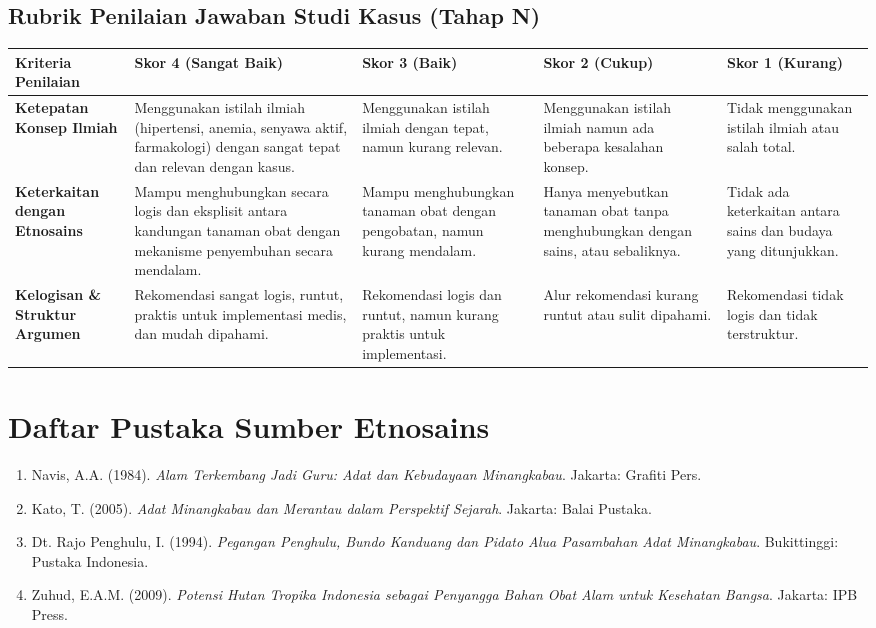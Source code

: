 \documentclass[a4paper,12pt]{article}
\begin{document}
\subsection{Rubrik Penilaian Jawaban Studi Kasus (Tahap N)}

\begin{longtable}{|p{3cm}|p{3cm}|p{3cm}|p{3cm}|p{3cm}|}
\hline
\textbf{Kriteria Penilaian} & \textbf{Skor 4 (Sangat Baik)} & \textbf{Skor 3 (Baik)} & \textbf{Skor 2 (Cukup)} & \textbf{Skor 1 (Kurang)} \\
\hline
\textbf{Ketepatan Konsep Ilmiah} & Menggunakan istilah ilmiah (hipertensi, anemia, senyawa aktif, farmakologi) dengan sangat tepat dan relevan dengan kasus. & Menggunakan istilah ilmiah dengan tepat, namun kurang relevan. & Menggunakan istilah ilmiah namun ada beberapa kesalahan konsep. & Tidak menggunakan istilah ilmiah atau salah total. \\
\hline
\textbf{Keterkaitan dengan Etnosains} & Mampu menghubungkan secara logis dan eksplisit antara kandungan tanaman obat dengan mekanisme penyembuhan secara mendalam. & Mampu menghubungkan tanaman obat dengan pengobatan, namun kurang mendalam. & Hanya menyebutkan tanaman obat tanpa menghubungkan dengan sains, atau sebaliknya. & Tidak ada keterkaitan antara sains dan budaya yang ditunjukkan. \\
\hline
\textbf{Kelogisan \& Struktur Argumen} & Rekomendasi sangat logis, runtut, praktis untuk implementasi medis, dan mudah dipahami. & Rekomendasi logis dan runtut, namun kurang praktis untuk implementasi. & Alur rekomendasi kurang runtut atau sulit dipahami. & Rekomendasi tidak logis dan tidak terstruktur. \\
\hline
\end{longtable}

\section{Daftar Pustaka Sumber Etnosains}

\begin{enumerate}
\item Navis, A.A. (1984). \textit{Alam Terkembang Jadi Guru: Adat dan Kebudayaan Minangkabau}. Jakarta: Grafiti Pers.
\item Kato, T. (2005). \textit{Adat Minangkabau dan Merantau dalam Perspektif Sejarah}. Jakarta: Balai Pustaka.
\item Dt. Rajo Penghulu, I. (1994). \textit{Pegangan Penghulu, Bundo Kanduang dan Pidato Alua Pasambahan Adat Minangkabau}. Bukittinggi: Pustaka Indonesia.
\item Zuhud, E.A.M. (2009). \textit{Potensi Hutan Tropika Indonesia sebagai Penyangga Bahan Obat Alam untuk Kesehatan Bangsa}. Jakarta: IPB Press.
\end{enumerate}
\end{document}
